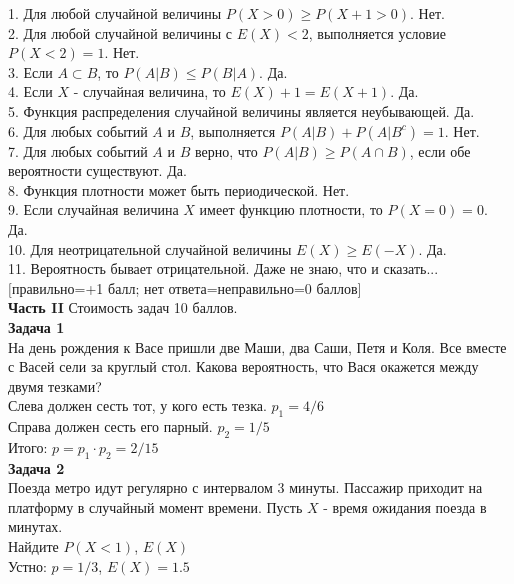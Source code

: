 \documentclass[pdftex,12pt,a4paper]{article}
\begin{document}
1. Для любой случайной величины $P(X>0)\ge P(X+1>0)$. Нет. \\

2. Для любой случайной величины с $E(X)<2$, выполняется условие $P(X<2)=1$. Нет. \\

3. Если $A\subset B$, то $P(A|B)\le P(B|A)$. Да. \\

4. Если  $X$  - случайная величина, то $E(X)+1=E(X+1)$. Да. \\

5. Функция распределения случайной величины является неубывающей. Да. \\

6. Для любых событий $A$ и $B$, выполняется $P(A|B)+P(A|B^{c})=1$. Нет. \\

7. Для любых событий  $A$  и  $B$  верно, что $P(A|B)\ge P(A\cap
B)$, если обе вероятности существуют. Да.  \\

8. Функция плотности может быть периодической. Нет. \\

9. Если случайная величина $X$ имеет функцию плотности, то $P(X=0)=0$. Да.  \\

10. Для неотрицательной случайной величины $E(X)\ge E(-X)$. Да. \\

11. Вероятность бывает отрицательной. Даже не знаю, что и сказать... \\


$[$правильно=+1 балл; нет ответа=неправильно=0 баллов$]$ \\




\pagebreak \textbf{Часть II} Стоимость задач 10 баллов. \\


\textbf{Задача 1} \\ %
На день рождения к Васе пришли две Маши, два Саши, Петя и Коля. Все вместе с Васей сели за круглый стол. Какова вероятность, что Вася окажется между двумя тезками? \\
Слева должен сесть тот, у кого есть тезка. $p_{1}=4/6$\\
Справа должен сесть его парный. $p_{2}=1/5$ \\
Итого: $p=p_{1}\cdot p_{2}=2/15$ \\

\textbf{Задача 2} \\ %
Поезда метро идут регулярно с интервалом 3 минуты. Пассажир
приходит на платформу в случайный момент времени. Пусть $X$ -
время ожидания поезда в минутах. \\
Найдите $P(X<1)$, $E(X)$ \\
Устно: $p=1/3$, $E(X)=1.5$ \\
\end{document}
